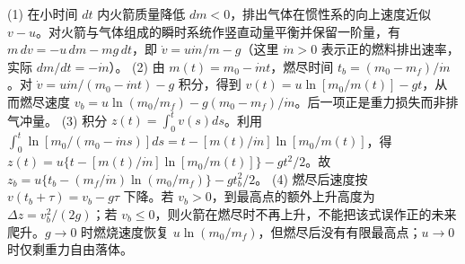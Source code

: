 (1) 在小时间 \(dt\) 内火箭质量降低 \(dm<0\)，排出气体在惯性系的向上速度近似 \(v-u\)。对火箭与气体组成的瞬时系统作竖直动量平衡并保留一阶量，有 \(m\,dv=-u\,dm-mg\,dt\)，即 \(\dot v=u\dot m/m-g\)（这里 \(\dot m>0\) 表示正的燃料排出速率，实际 \(dm/dt=-\dot m\)）。
(2) 由 \(m(t)=m_0-\dot m t\)，燃尽时间 \(t_b=(m_0-m_f)/\dot m\)。对 \(\dot v=u\dot m/(m_0-\dot m t)-g\) 积分，得到 \(v(t)=u\ln[m_0/m(t)]-gt\)，从而燃尽速度 \(v_b=u\ln(m_0/m_f)-g(m_0-m_f)/\dot m\)。后一项正是重力损失而非排气冲量。
(3) 积分 \(z(t)=\int_0^t v(s)ds\)。利用 \(\int_0^t\ln[m_0/(m_0-\dot m s)]ds=t-[m(t)/\dot m]\ln[m_0/m(t)]\)，得 \(z(t)=u\{t-[m(t)/\dot m]\ln[m_0/m(t)]\}-gt^2/2\)。故 \(z_b=u\{t_b-(m_f/\dot m)\ln(m_0/m_f)\}-gt_b^2/2\)。
(4) 燃尽后速度按 \(v(t_b+\tau)=v_b-g\tau\) 下降。若 \(v_b>0\)，到最高点的额外上升高度为 \(\Delta z=v_b^2/(2g)\)；若 \(v_b\le0\)，则火箭在燃尽时不再上升，不能把该式误作正的未来爬升。\(g\to0\) 时燃烧速度恢复 \(u\ln(m_0/m_f)\)，但燃尽后没有有限最高点；\(u\to0\) 时仅剩重力自由落体。

